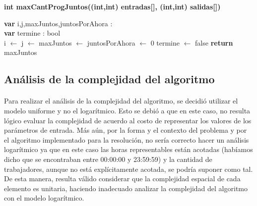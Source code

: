 	\incmargin{1em}
	\linesnumbered
	\textbf{int maxCantProgJuntos((int,int) entradas[], (int,int) salidas[])}\\
		\begin{algorithm}[H]
			\BlankLine
			\textbf{var} i,j,maxJuntos,juntosPorAhora : \entero \\
			\textbf{var} termine : bool \\
			\BlankLine
			i $\leftarrow$ j $\leftarrow$ maxJuntos $\leftarrow$ juntosPorAhora $\leftarrow$ 0
			termine $\leftarrow$ false
			\BlankLine
			\BlankLine
			\textbf{return} maxJuntos
		\end{algorithm}


\subsection{Análisis de la complejidad del algoritmo}

\paragraph{}
Para realizar el análisis de la complejidad del algoritmo, se decidió utilizar el modelo uniforme y no el logarítmico. Esto se debió a que en este caso, no resulta lógico evaluar la complejidad de acuerdo al costo de representar los valores de los parámetros de entrada. Más aún, por la forma y el contexto del problema y por el algoritmo implementado para la resolución, no sería correcto hacer un análisis logarítmico ya que en este caso las horas representables están acotadas (habíamos dicho que se encontraban entre 00:00:00 y 23:59:59) y la cantidad de trabajadores, aunque no está explícitamente acotada, se podría suponer como tal. De esta manera, resulta válido considerar que la complejidad espacial de cada elemento es unitaria, haciendo inadecuado analizar la complejidad del algoritmo con el modelo logarítmico.

